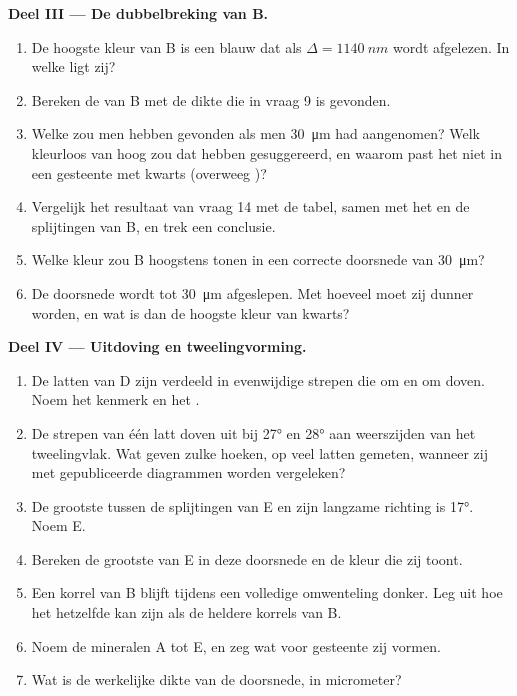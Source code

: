 \begin{problem}
\medskip
\noindent\textbf{Deel III --- De dubbelbreking van B.}
\begin{enumerate}[resume]
  \item De hoogste kleur van B is een blauw dat als $\Delta = \qty{1140}{nm}$ wordt afgelezen. In welke  ligt zij?
  \item Bereken de  van B met de dikte die in vraag 9 is gevonden.
  \item Welke  zou men hebben gevonden als men \qty{30}{\micro m} had aangenomen? Welk kleurloos  van hoog
         zou dat hebben gesuggereerd, en waarom past het niet in een gesteente met kwarts (overweeg
        )?
  \item Vergelijk het resultaat van vraag 14 met de tabel, samen met het  en de splijtingen van B, en trek een conclusie.
  \item Welke kleur zou B hoogstens tonen in een correcte doorsnede van \qty{30}{\micro m}?
  \item De doorsnede wordt tot \qty{30}{\micro m} afgeslepen. Met hoeveel moet zij dunner worden, en wat is dan de hoogste kleur van kwarts?
\end{enumerate}

\medskip
\noindent\textbf{Deel IV --- Uitdoving en tweelingvorming.}
\begin{enumerate}[resume]
  \item De latten van D zijn verdeeld in evenwijdige strepen die om en om doven. Noem het kenmerk en het .
  \item De strepen van één latt doven uit bij \ang{27} en \ang{28} aan weerszijden van het tweelingvlak. Wat geven zulke hoeken,
        op veel latten gemeten, wanneer zij met gepubliceerde diagrammen worden vergeleken?
  \item De grootste  tussen de splijtingen van E en zijn langzame richting is \ang{17}. Noem E.
  \item Bereken de grootste  van E in deze doorsnede en de kleur die zij toont.
  \item Een korrel van B blijft tijdens een volledige omwenteling donker. Leg uit hoe het hetzelfde  kan zijn als de heldere
        korrels van B.
  \item Noem de mineralen A tot E, en zeg wat voor gesteente zij vormen.
  \item Wat is de werkelijke dikte van de doorsnede, in micrometer?
\end{enumerate}
\end{problem}
